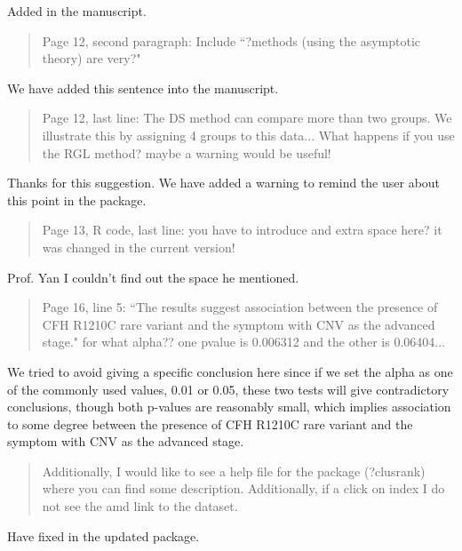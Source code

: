\documentclass[12pt]{article}
\newenvironment{comment}%
{\begin{quotation}\noindent\small\it\ignorespaces%
  }{\end{quotation}}
\begin{document}
Added in the manuscript.

\begin{comment}
Page 12, second paragraph: Include ``?methods (using the asymptotic theory) are
very?"
\end{comment}

We have added this sentence into the manuscript.

\begin{comment}
Page 12, last line: The DS method can compare more than two groups. We illustrate
this by assigning 4 groups to this data... What happens if you use the RGL method?
maybe a warning would be useful!
\end{comment}

Thanks for this suggestion. We have added a warning to remind the user about
this point in the package.

\begin{comment}
Page 13, R code, last line: you have to introduce and extra space here? it was
changed in the current version!
\end{comment}

Prof. Yan I couldn't find out the space he mentioned.

\begin{comment}

Page 16, line 5: ``The results suggest association between the presence of CFH
R1210C rare variant and the symptom with CNV as the advanced stage." for what
alpha?? one pvalue is 0.006312 and the other is 0.06404...
\end{comment}

We tried to avoid giving a specific conclusion here since if we set the
alpha as one of the commonly used values, 0.01 or 0.05, these two tests will
give contradictory conclusions, though both p-values are reasonably small,
which implies association to some degree between the presence of CFH R1210C
rare variant and the symptom with CNV as the advanced stage.

\begin{comment}
Additionally, I would like to see a help file for the package (?clusrank)
where you can find some description.
Additionally, if a click on index I do not see the amd link to the dataset.
\end{comment}

Have fixed in the updated package.



\end{document}
